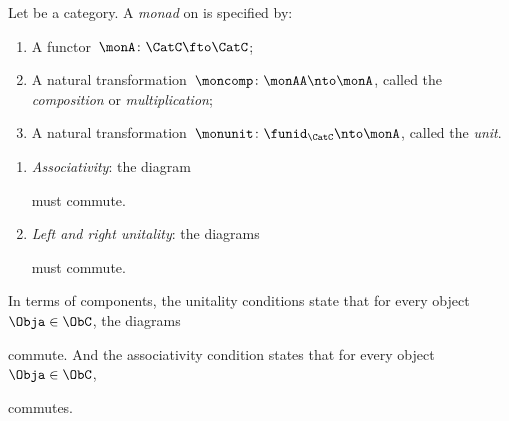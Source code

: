 \begin{ctdefinition}[Monad]
	\label{def:monad}
	Let \CatC be a category.
	A \emph{monad} on \CatC is specified by:\\
	\constit
	\begin{enumerate}
		\item A functor~$ \monA \colon \CatC \fto \CatC$;
		\item A natural transformation~$\moncomp \colon \monAA \nto \monA$, called the \emph{composition} or \emph{multiplication};
		\item A natural transformation~$\monunit \colon \funid_\CatC \nto \monA$, called the \emph{unit}.
	\end{enumerate}
	\condit
	\begin{enumerate}
		\item \emph{Associativity}: the diagram
		      \begin{center}
			      \label{eq:monad-associativity}
		      \end{center}
		      must commute.
		\item \emph{Left and right unitality}: the diagrams
		      \begin{center}
			      \label{eq:monad-unitality}
		      \end{center}
		      must commute.
	\end{enumerate}
\end{ctdefinition}

\begin{remark}
	\label{rem:monad-condition-components}
	In terms of components, the unitality conditions state that for every object~$\Obja \in \ObC$, the diagrams

	\begin{center}
	\end{center}

	commute.
	And the associativity condition states that for every object~$\Obja \in \ObC$,

	\begin{center}
	\end{center}

	commutes.
\end{remark}


